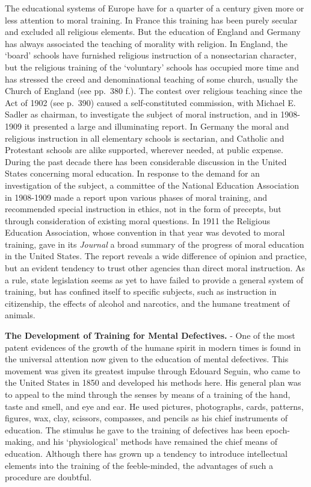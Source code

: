 \documentclass[]{book}
\begin{document}
The educational systems of Europe have for a quarter of a century given more or less attention to moral training. In France this training has been purely secular and excluded all religious elements. But the education of England and Germany has always associated the teaching of morality with religion. In England, the `board' schools have furnished religious instruction of a nonsectarian character, but the religious training of the `voluntary' schools has occupied more time and has stressed the creed and denominational teaching of some church, usually the Church of England (see pp.~380 f.). The contest over religious teaching since the Act of 1902 (see p.~390) caused a self-constituted commission, with Michael E. Sadler as chairman, to investigate the subject of moral instruction, and in 1908-1909 it presented a large and illuminating report. In Germany the moral and religious instruction in all elementary schools is sectarian, and Catholic and Protestant schools are alike supported, wherever needed, at public expense. During the past decade there has been considerable discussion in the United States concerning moral education. In response to the demand for an investigation of the subject, a committee of the National Education Association in 1908-1909 made a report upon various phases of moral training, and recommended special instruction in ethics, not in the form of precepts, but through consideration of existing moral questions. In 1911 the Religious Education Association, whose convention in that year was devoted to moral training, gave in its \emph{Journal} a broad summary of the progress of moral education in the United States. The report reveals a wide difference of opinion and practice, but an evident tendency to trust other agencies than direct moral instruction. As a rule, state legislation seems as yet to have failed to provide a general system of training, but has confined itself to specific subjects, such as instruction in citizenship, the effects of alcohol and narcotics, and the humane treatment of animals.

\textbf{The Development of Training for Mental Defectives.} - One of the most patent evidences of the growth of the humane spirit in modern times is found in the universal attention now given to the education of mental defectives. This movement was given its greatest impulse through Edouard Seguin, who came to the United States in 1850 and developed his methods here. His general plan was to appeal to the mind through the senses by means of a training of the hand, taste and smell, and eye and ear. He used pictures, photographs, cards, patterns, figures, wax, clay, scissors, compasses, and pencils as his chief instruments of education. The stimulus he gave to the training of defectives has been epoch-making, and his `physiological' methods have remained the chief means of education. Although there has grown up a tendency to introduce intellectual elements into the training of the feeble-minded, the advantages of such a procedure are doubtful.
\end{document}
